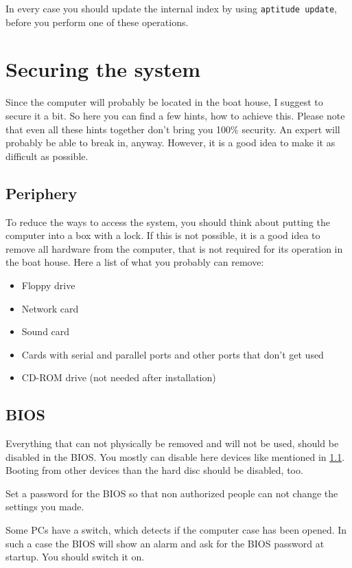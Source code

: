 \documentclass[a4paper,12pt,twoside]{article}
\begin{document}
In every case you should update the internal index by using
\texttt{aptitude update}, before you perform one
of these operations.


\section{Securing the system}
\label{sct:system_secure}
Since the computer will probably be
located in the boat house, I suggest to secure it a bit. So here you
can find a few hints, how to achieve this. Please note that even all
these hints together don't bring you 100\% security.
An expert will probably be able to break in, anyway. However, it is a
good idea to make it as difficult as possible.


\subsection{Periphery}
\label{sct:periphery}
To reduce the ways to access the system, you should think about putting
the computer into a box with a lock. If this is not possible, it is a 
good idea to remove all hardware from the computer, that is not
required for its operation in the boat house. Here a list of what you
probably can remove:

\begin{itemize}
    \item Floppy drive
    \item Network card
    \item Sound card
    \item Cards with serial and parallel ports and other ports that
        don't get used
    \item CD-ROM drive (not needed after installation)
\end{itemize}


\subsection{BIOS}
\label{sct:bios}
Everything that can not physically be removed and will not be used,
should be disabled in the BIOS. You mostly can disable here devices
like mentioned in \ref{sct:periphery}. Booting from other devices than 
the hard disc should be disabled, too.

Set a password for the BIOS so that non authorized people can not change
the settings you made.

Some PCs have a switch, which detects if the computer case has been
opened. In such a case the BIOS will show an alarm and ask for the BIOS
password at startup. You should switch it on.
\end{document}
